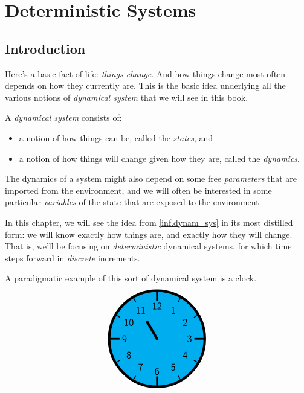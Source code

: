 \documentclass[DynamicalBook]{subfiles}
\begin{document}
%




\setcounter{chapter}{0}%


\chapter{Deterministic Systems}\label{chapter.1}

\section{Introduction}

Here's a basic fact of life: \emph{things change}. And how things change most
often depends on how they currently are. This is the basic idea underlying all the various notions of \emph{dynamical
  system} that we will see in this book.

\begin{informal}\label{inf.dynam_sys}
  A \emph{dynamical system} consists of:
  \begin{itemize}
  \item a notion of how things can be, called the \emph{states}, and
  \item a notion of how things will change given how they are, called the \emph{dynamics}.
  \end{itemize}
  The dynamics of a system might also depend on some free \emph{parameters} that are imported from the environment, and
  we will often be interested in some particular \emph{variables} of the
  state that are exposed to the environment. 
\end{informal}

In this chapter, we will see the idea from \cref{inf.dynam_sys} in its
most distilled form: we will know exactly how things are, and exactly how they will change. That is, we'll be focusing on \emph{deterministic} dynamical systems,
for which time steps forward in \emph{discrete} increments.


A paradigmatic example of this sort of dynamical system is a clock.
\[
\begin{tikzpicture}[line cap=rect,line width=3pt]
\filldraw [fill=cyan] (0,0) circle [radius=2cm];
\foreach \angle [count=\xi] in {60,30,...,-270}
{
  \draw[line width=1pt] (\angle:1.8cm) -- (\angle:2cm);
  \node[font=\large] at (\angle:1.36cm) {\textsf{\xi}};
}
\foreach \angle in {0,90,180,270}
  \draw[line width=2pt] (\angle:1.6cm) -- (\angle:2cm);
\draw (0,0) -- (120:0.8cm);
\end{tikzpicture}
\]
\end{document}
